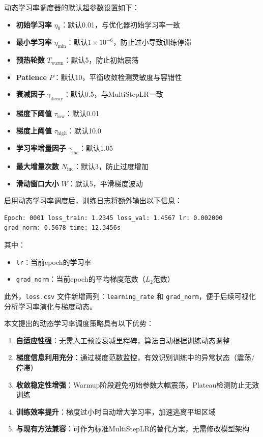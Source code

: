 
动态学习率调度器的默认超参数设置如下：

\begin{itemize}
    \item \textbf{初始学习率} $\eta_0$：默认0.01，与优化器初始学习率一致
    \item \textbf{最小学习率} $\eta_{\text{min}}$：默认$1 \times 10^{-6}$，防止过小导致训练停滞
    \item \textbf{预热轮数} $T_{\text{warm}}$：默认5，防止初始震荡
    \item \textbf{Patience} $P$：默认10，平衡收敛检测灵敏度与容错性
    \item \textbf{衰减因子} $\gamma_{\text{decay}}$：默认0.5，与MultiStepLR一致
    \item \textbf{梯度下阈值} $\tau_{\text{low}}$：默认0.01
    \item \textbf{梯度上阈值} $\tau_{\text{high}}$：默认10.0
    \item \textbf{学习率增量因子} $\gamma_{\text{inc}}$：默认1.05
    \item \textbf{最大增量次数} $N_{\text{inc}}$：默认3，防止过度增加
    \item \textbf{滑动窗口大小} $W$：默认5，平滑梯度波动
\end{itemize}


启用动态学习率调度后，训练日志将额外输出以下信息：

\begin{verbatim}
Epoch: 0001 loss_train: 1.2345 loss_val: 1.4567 lr: 0.002000 grad_norm: 0.5678 time: 12.3456s
\end{verbatim}

其中：
\begin{itemize}
    \item \texttt{lr}：当前epoch的学习率
    \item \texttt{grad\_norm}：当前epoch的平均梯度范数（$L_2$范数）
\end{itemize}

此外，\texttt{loss.csv} 文件新增两列：\texttt{learning\_rate} 和 \texttt{grad\_norm}，便于后续可视化分析学习率演化与梯度动态。


本文提出的动态学习率调度策略具有以下优势：

\begin{enumerate}
    \item \textbf{自适应性强}：无需人工预设衰减里程碑，算法自动根据训练动态调整
    \item \textbf{梯度信息利用充分}：通过梯度范数监控，有效识别训练中的异常状态（震荡/停滞）
    \item \textbf{收敛稳定性增强}：Warmup阶段避免初始参数大幅震荡，Plateau检测防止无效训练
    \item \textbf{训练效率提升}：梯度过小时自动增大学习率，加速逃离平坦区域
    \item \textbf{与现有方法兼容}：可作为标准MultiStepLR的替代方案，无需修改模型架构
\end{enumerate}

